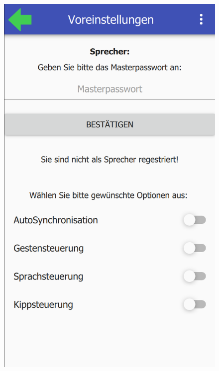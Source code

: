 \begin{figure}[ht!]
\begin{minipage}{0.31\linewidth}
		\includegraphics[scale=0.5]{GUI/Bilder/3-S-1-Voreinstellung.PNG}
	\end{minipage}
	\begin{minipage}{0.31\linewidth}
		\centering

\end{minipage}
\end{figure}
